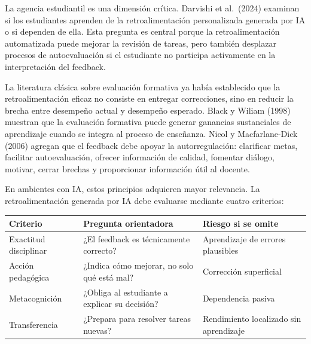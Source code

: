 \documentclass[
  spanish,
  letterpaper,
  DIV=11,
  numbers=noendperiod]{scrartcl}
\begin{document}
La agencia estudiantil es una dimensión crítica. Darvishi et al.~(2024)
examinan si los estudiantes aprenden de la retroalimentación
personalizada generada por IA o si dependen de ella. Esta pregunta es
central porque la retroalimentación automatizada puede mejorar la
revisión de tareas, pero también desplazar procesos de autoevaluación si
el estudiante no participa activamente en la interpretación del
feedback.

La literatura clásica sobre evaluación formativa ya había establecido
que la retroalimentación eficaz no consiste en entregar correcciones,
sino en reducir la brecha entre desempeño actual y desempeño esperado.
Black y Wiliam (1998) muestran que la evaluación formativa puede generar
ganancias sustanciales de aprendizaje cuando se integra al proceso de
enseñanza. Nicol y Macfarlane-Dick (2006) agregan que el feedback debe
apoyar la autorregulación: clarificar metas, facilitar autoevaluación,
ofrecer información de calidad, fomentar diálogo, motivar, cerrar
brechas y proporcionar información útil al docente.

En ambientes con IA, estos principios adquieren mayor relevancia. La
retroalimentación generada por IA debe evaluarse mediante cuatro
criterios:

\begin{longtable}[]{@{}
  >{\raggedright\arraybackslash}p{}
  >{\raggedright\arraybackslash}p{}
  >{\raggedright\arraybackslash}p{}@{}}
\toprule\noalign{}
\begin{minipage}[b]{\linewidth}\raggedright
Criterio
\end{minipage} & \begin{minipage}[b]{\linewidth}\raggedright
Pregunta orientadora
\end{minipage} & \begin{minipage}[b]{\linewidth}\raggedright
Riesgo si se omite
\end{minipage} \\
\midrule\noalign{}
\endhead
\bottomrule\noalign{}
\endlastfoot
Exactitud disciplinar & ¿El feedback es técnicamente correcto? &
Aprendizaje de errores plausibles \\
Acción pedagógica & ¿Indica cómo mejorar, no solo qué está mal? &
Corrección superficial \\
Metacognición & ¿Obliga al estudiante a explicar su decisión? &
Dependencia pasiva \\
Transferencia & ¿Prepara para resolver tareas nuevas? & Rendimiento
localizado sin aprendizaje \\
\end{longtable}
\end{document}
